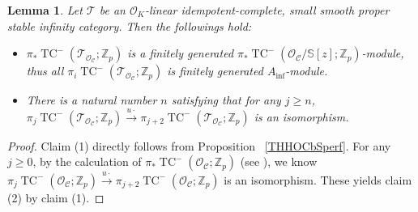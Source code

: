 \documentclass[11pt]{amsart}
\newcommand{\Z}{\mathbb{Z}}
\newcommand{\sO}{\mathcal{O}}
\newcommand{\sT}{\mathcal{T}}
\newcommand{\bS}{\mathbb{S}}
\newcommand{\TCn}{\operatorname{TC}^{-}}
\newcommand{\Ainf}{A_{\operatorname{inf}}}
\newcommand{\Cu}{\mathcal{C}}
\newtheorem{lemma}{Lemma}[section]
\theoremstyle{definition}
\theoremstyle{remark}
\numberwithin{equation}{section}
\begin{document}
\begin{lemma}\label{periodlemma2}
Let $\sT$ be an $\sO_K$-linear idempotent-complete, small smooth proper stable infinity category. Then the followings hold:
\begin{itemize}
  \item[(1)] $\pi_*\TCn(\sT_{\sO_\Cu};\Z_p)$ is a finitely generated $\pi_*\TCn(\sO_\Cu/\bS[z];\Z_p)$-module, thus all $\pi_i\TCn(\sT_{\sO_\Cu};\Z_p)$ is finitely generated $\Ainf$-module.
  \item[(2)] There is a natural number $n$ satisfying that for any $j \geq n$, $\pi_j\TCn(\sT_{\sO_\Cu};\Z_p)\overset{u\cdot }{\to} \pi_{j+2}\TCn(\sT_{\sO_\Cu};\Z_p)$ is an isomorphism. 
\end{itemize}
\end{lemma}
\begin{proof}
Claim (1) directly follows from Proposition ~\ref{THHOCbSperf}. For any $j \geq 0$, by the calculation of $\pi_* \TCn({\sO_\Cu};\Z_p)$ (see \cite[Proposition 11.10]{BMS2}), we know $\pi_j\TCn({\sO_\Cu};\Z_p)\overset{u\cdot}{\to} \pi_{j+2}\TCn({\sO_\Cu};\Z_p)$ is an isomorphism. These yields claim (2) by claim (1).
\end{proof}
\end{document}
